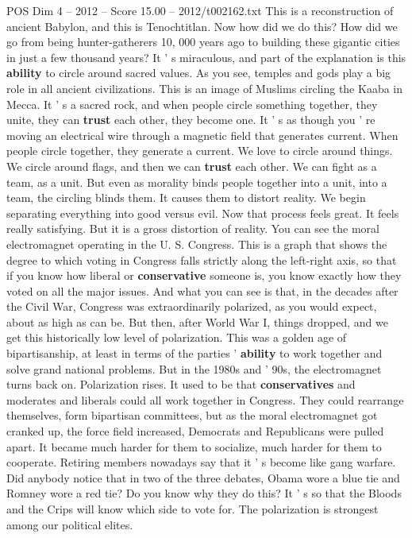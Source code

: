 \begin{textsample}{POS Dim 4 – 2012 – Score 15.00 – 2012/t002162.txt}
This is a reconstruction of ancient Babylon, and this is Tenochtitlan.
Now how did we do this?
How did we go from being hunter-gatherers 10, 000 years ago to building these gigantic cities in just a few thousand years?
It ' s miraculous, and part of the explanation is this \textbf{ability} to circle around sacred values.
As you see, temples and gods play a big role in all ancient civilizations.
This is an image of Muslims circling the Kaaba in Mecca.
It ' s a sacred rock, and when people circle something together, they unite, they can \textbf{trust} each other, they become one.
It ' s as though you ' re moving an electrical wire through a magnetic field that generates current.
When people circle together, they generate a current.
We love to circle around things.
We circle around flags, and then we can \textbf{trust} each other.
We can fight as a team, as a unit.
But even as morality binds people together into a unit, into a team, the circling blinds them.
It causes them to distort reality.
We begin separating everything into good versus evil.
Now that process feels great.
It feels really satisfying.
But it is a gross distortion of reality.
You can see the moral electromagnet operating in the U.
S.
Congress.
This is a graph that shows the degree to which voting in Congress falls strictly along the left-right axis, so that if you know how liberal or \textbf{conservative} someone is, you know exactly how they voted on all the major issues.
And what you can see is that, in the decades after the Civil War, Congress was extraordinarily polarized, as you would expect, about as high as can be.
But then, after World War I, things dropped, and we get this historically low level of polarization.
This was a golden age of bipartisanship, at least in terms of the parties ' \textbf{ability} to work together and solve grand national problems.
But in the 1980s and ' 90s, the electromagnet turns back on.
Polarization rises.
It used to be that \textbf{conservatives} and moderates and liberals could all work together in Congress.
They could rearrange themselves, form bipartisan committees, but as the moral electromagnet got cranked up, the force field increased, Democrats and Republicans were pulled apart.
It became much harder for them to socialize, much harder for them to cooperate.
Retiring members nowadays say that it ' s become like gang warfare.
Did anybody notice that in two of the three debates, Obama wore a blue tie and Romney wore a red tie?
Do you know why they do this?
It ' s so that the Bloods and the Crips will know which side to vote for.
The polarization is strongest among our political elites.

\end{textsample}
